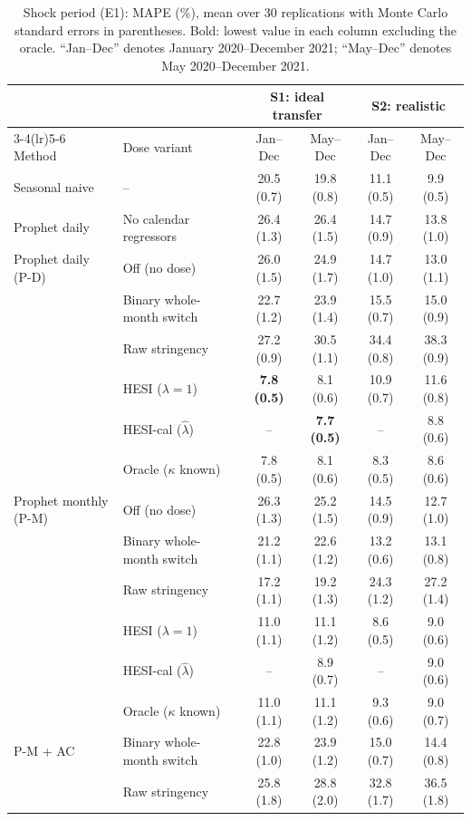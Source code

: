 \documentclass{article}
\theoremstyle{plain}
\theoremstyle{definition}
\theoremstyle{remark}
\begin{document}
\begin{table}[!tb]
\centering
\caption{Shock period (E1): MAPE (\%), mean over 30 replications with Monte Carlo standard errors in parentheses. Bold: lowest value in each column excluding the oracle. ``Jan--Dec'' denotes January 2020--December 2021; ``May--Dec'' denotes May 2020--December 2021.}
\label{tab:e1}
\footnotesize
\begin{tabular}{llcccc}
\toprule
 & & \multicolumn{2}{c}{S1: ideal transfer} & \multicolumn{2}{c}{S2: realistic} \\
\cmidrule(lr){3-4}\cmidrule(lr){5-6}
Method & Dose variant & Jan--Dec & May--Dec & Jan--Dec & May--Dec \\
\midrule
Seasonal naive & -- & 20.5 (0.7) & 19.8 (0.8) & 11.1 (0.5) & 9.9 (0.5) \\
\addlinespace
Prophet daily & No calendar regressors & 26.4 (1.3) & 26.4 (1.5) & 14.7 (0.9) & 13.8 (1.0) \\
\addlinespace
Prophet daily (P-D) & Off (no dose) & 26.0 (1.5) & 24.9 (1.7) & 14.7 (1.0) & 13.0 (1.1) \\
 & Binary whole-month switch & 22.7 (1.2) & 23.9 (1.4) & 15.5 (0.7) & 15.0 (0.9) \\
 & Raw stringency & 27.2 (0.9) & 30.5 (1.1) & 34.4 (0.8) & 38.3 (0.9) \\
 & HESI ($\lambda=1$) & \textbf{7.8 (0.5)} & 8.1 (0.6) & 10.9 (0.7) & 11.6 (0.8) \\
 & HESI-cal ($\hat\lambda$) & -- & \textbf{7.7 (0.5)} & -- & 8.8 (0.6) \\
 & Oracle ($\kappa$ known) & 7.8 (0.5) & 8.1 (0.6) & 8.3 (0.5) & 8.6 (0.6) \\
\addlinespace
Prophet monthly (P-M) & Off (no dose) & 26.3 (1.3) & 25.2 (1.5) & 14.5 (0.9) & 12.7 (1.0) \\
 & Binary whole-month switch & 21.2 (1.1) & 22.6 (1.2) & 13.2 (0.6) & 13.1 (0.8) \\
 & Raw stringency & 17.2 (1.1) & 19.2 (1.3) & 24.3 (1.2) & 27.2 (1.4) \\
 & HESI ($\lambda=1$) & 11.0 (1.1) & 11.1 (1.2) & 8.6 (0.5) & 9.0 (0.6) \\
 & HESI-cal ($\hat\lambda$) & -- & 8.9 (0.7) & -- & 9.0 (0.6) \\
 & Oracle ($\kappa$ known) & 11.0 (1.1) & 11.1 (1.2) & 9.3 (0.6) & 9.0 (0.7) \\
\addlinespace
P-M + AC & Binary whole-month switch & 22.8 (1.0) & 23.9 (1.2) & 15.0 (0.7) & 14.4 (0.8) \\
 & Raw stringency & 25.8 (1.8) & 28.8 (2.0) & 32.8 (1.7) & 36.5 (1.8) \\

\end{tabular}
\end{table}
\end{document}

